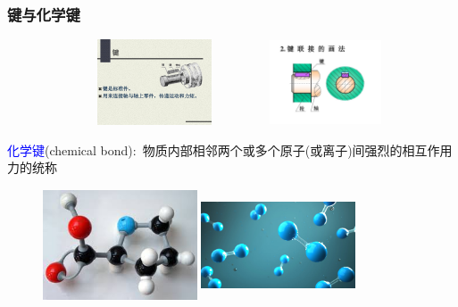 \frame
{
	\frametitle{键与化学键}
\begin{figure}[h!]
\centering
\vspace{-10.5pt}
\includegraphics[height=1.00in ,width=2.60in,viewport=45 250 1000 590,clip]{Figures/Bond.jpeg}
\includegraphics[height=1.00in,width=1.30in,viewport=180 110 915 650,clip]{Figures/Bond_2.jpeg}
\label{Bond}
\end{figure}
\textcolor{blue}{化学键}(\textrm{chemical bond}):~物质内部相邻两个或多个原子(或离子)间强烈的相互作用力的统称
\begin{figure}[h!]
\centering
\vspace{-10.5pt}
\includegraphics[height=1.30in,width=1.80in,viewport=0 0 315 210,clip]{Figures/Molecular-Chemical-bonding.jpeg}
\includegraphics[height=1.30in,width=1.80in,viewport=0 0 1050 650,clip]{Figures/Chemical_Bonding_2.jpg}
\label{Chemical_Bond-1}
\end{figure}
}

